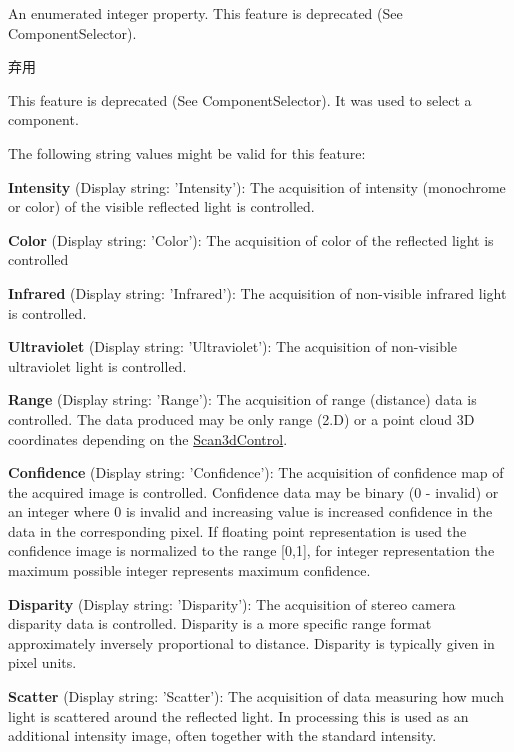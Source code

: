 An enumerated integer property. This feature is deprecated (See Component\+Selector). 

\begin{DoxyRefDesc}{弃用}
\item[\hyperlink{deprecated__deprecated000039}{弃用}]This feature is deprecated (See Component\+Selector). It was used to select a component.\end{DoxyRefDesc}


The following string values might be valid for this feature\+:
\begin{DoxyItemize}
\item {\bfseries Intensity} (Display string\+: 'Intensity')\+: The acquisition of intensity (monochrome or color) of the visible reflected light is controlled.
\item {\bfseries Color} (Display string\+: 'Color')\+: The acquisition of color of the reflected light is controlled
\item {\bfseries Infrared} (Display string\+: 'Infrared')\+: The acquisition of non-\/visible infrared light is controlled.
\item {\bfseries Ultraviolet} (Display string\+: 'Ultraviolet')\+: The acquisition of non-\/visible ultraviolet light is controlled.
\item {\bfseries Range} (Display string\+: 'Range')\+: The acquisition of range (distance) data is controlled. The data produced may be only range (2.\+D) or a point cloud 3\+D coordinates depending on the \hyperlink{classmv_i_m_p_a_c_t_1_1acquire_1_1_gen_i_cam_1_1_scan3d_control}{Scan3d\+Control}.
\item {\bfseries Confidence} (Display string\+: 'Confidence')\+: The acquisition of confidence map of the acquired image is controlled. Confidence data may be binary (0 -\/ invalid) or an integer where 0 is invalid and increasing value is increased confidence in the data in the corresponding pixel. If floating point representation is used the confidence image is normalized to the range \mbox{[}0,1\mbox{]}, for integer representation the maximum possible integer represents maximum confidence.
\item {\bfseries Disparity} (Display string\+: 'Disparity')\+: The acquisition of stereo camera disparity data is controlled. Disparity is a more specific range format approximately inversely proportional to distance. Disparity is typically given in pixel units.
\item {\bfseries Scatter} (Display string\+: 'Scatter')\+: The acquisition of data measuring how much light is scattered around the reflected light. In processing this is used as an additional intensity image, often together with the standard intensity.
\end{DoxyItemize}

